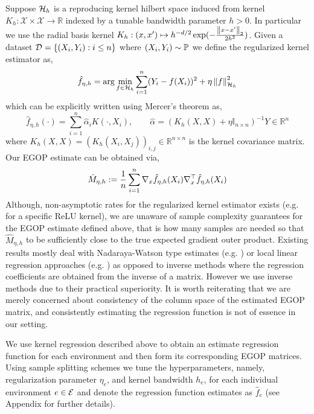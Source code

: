 Suppose $\hilbert_h$ is a reproducing kernel hilbert space induced from kernel $K_h:\mathcal{X} \times \mathcal{X} \to \mathbb{R}$ indexed by a tunable bandwidth parameter $h > 0$. 
In particular we use the radial basis kernel $K_h:(x,x') \mapsto h^{-d/2} \exp( -\frac{ \norm[2]{x - x'} }{2 h^2} ) $. 
Given a dataset $\dataset = \left\{ (X_i, Y_i) : i \leq n \right\}$ where $(X_i, Y_i) \sim \probability$ we define the regularized kernel estimator as,
$$ \hat{f}_{\eta, h} = \arg\min_{f \in \hilbert_h} \sum_{i=1}^{n} (Y_i - f(X_i))^2 + \eta \norm[ \hilbert_h ]{f}^2 $$
which can be explicitly written using Mercer's theorem as,
$$ \hat{f}_{\eta, h}(\cdot) = \sum_{i=1}^{n} \hat{\alpha}_i K(\cdot, X_i) ,\quad\quad \hat{\alpha} = \left( K_h(X, X) + \eta \mathbb{I}_{n \times n} \right)^{-1} Y \in \mathbb{R}^{n} $$ 
where $K_h(X,X) = (K_h(X_i, X_j))_{i,j} \in \mathbb{R}^{n \times n}$ is the kernel covariance matrix. Our EGOP estimate can be obtained via,
$$ \hat{M}_{\eta, h} := \frac{1}{n} \sum_{i=1}^{n} \nabla_x \hat{f}_{\eta, h}(X_i) \nabla^{\T}_x \hat{f}_{\eta, h}(X_i) $$
Although, non-asymptotic rates for the regularized kernel estimator exists (e.g. \citep{bach2017breaking} for a specific ReLU kernel), we are unaware of sample complexity guarantees for the EGOP estimate defined above, that is how many samples are needed so that $\hat{M}_{\eta,h}$ to be sufficiently close to the true expected gradient outer product.
Existing results mostly deal with Nadaraya-Watson type estimates (e.g. \citep{yuan2023efficient, trivedi2014consistent}) or local linear regression approaches (e.g. \citep{wu2010learning}) as opposed to inverse methods where the regression coefficients are obtained from the inverse of a matrix. 
However we use inverse methods due to their practical superiority.
It is worth reiterating that we are merely concerned about consistency of the column space of the estimated EGOP matrix, and consistently estimating the regression function is not of essence in our setting.

We use kernel regression described above to obtain an estimate regression function for each environment and then form its corresponding EGOP matrices.
Using sample splitting schemes we tune the hyperparameters, namely, regularization parameter $\eta_e$, and kernel bandwidth $h_e$, for each individual environment $e \in \environments$ and denote the regression function estimates as $\hat{f}_e$ (see Appendix for further details). 

